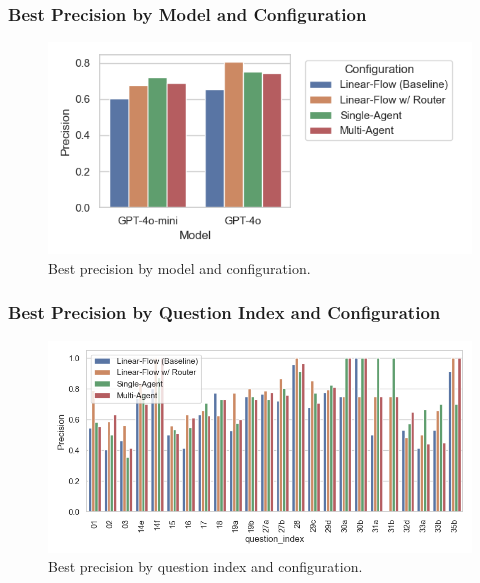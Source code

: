 
            \subsubsection{Best Precision by Model and Configuration}
            \begin{figure}[H]
                \centering
                \includegraphics[scale=0.75]{images_exp2/precision/bar_best_precision_by_model_and_configuration.png}
                \caption{Best precision by model and configuration.}
                \label{fig:bar_best_precision_by_model_and_configuration}
            \end{figure}

            \subsubsection{Best Precision by Question Index and Configuration}
            \begin{figure}[H]
                \centering
                \includegraphics[scale=0.75]{images_exp2/precision/best_precision_by_question_index_and_configuration.png}
                \caption{Best precision by question index and configuration.}
                \label{fig:best_precision_by_question_index_and_configuration}
            \end{figure}

